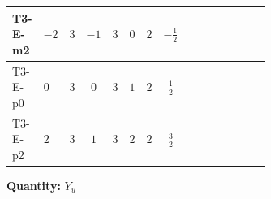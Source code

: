 \documentclass[8pt]{article}
\begin{document}
\begin{landscape}
\begin{longtable}{@{}llcccccc >{\raggedright\arraybackslash}p{0.21\linewidth} >{\raggedright\arraybackslash}p{0.21\linewidth} >{\raggedright\arraybackslash}p{0.21\linewidth}@{}}
\midrule
T3-E-m2 & $-2$ & $3$ & $-1$ & $3$ & $0$ & $2$ & $-\frac{1}{2}$ & \scriptsize\adjustbox{max width=\linewidth}{$\begin{gathered} 3 \operatorname{Tr}\!\left({Y_d}\,\left({Y_d}\right)^{\dagger}\right) \left({Y_u}\right)_{ij}\end{gathered}$} & \scriptsize\adjustbox{max width=\linewidth}{$\begin{gathered} +\operatorname{Tr}\!\left({Y_e}\,\left({Y_e}\right)^{\dagger}\right) \left({Y_u}\right)_{ij}\end{gathered}$} & \scriptsize\adjustbox{max width=\linewidth}{$\begin{gathered} +3 \operatorname{Tr}\!\left({Y_u}\,\left({Y_u}\right)^{\dagger}\right) \left({Y_u}\right)_{ij}\end{gathered}$} \\
\midrule
T3-E-p0 & $0$ & $3$ & $0$ & $3$ & $1$ & $2$ & $\frac{1}{2}$ & \scriptsize\adjustbox{max width=\linewidth}{$\begin{gathered} 3 \operatorname{Tr}\!\left({Y_d}\,\left({Y_d}\right)^{\dagger}\right) \left({Y_u}\right)_{ij}\end{gathered}$} & \scriptsize\adjustbox{max width=\linewidth}{$\begin{gathered} +\operatorname{Tr}\!\left({Y_e}\,\left({Y_e}\right)^{\dagger}\right) \left({Y_u}\right)_{ij}\end{gathered}$} & \scriptsize\adjustbox{max width=\linewidth}{$\begin{gathered} +3 \operatorname{Tr}\!\left({Y_u}\,\left({Y_u}\right)^{\dagger}\right) \left({Y_u}\right)_{ij}\end{gathered}$} \\
\midrule
T3-E-p2 & $2$ & $3$ & $1$ & $3$ & $2$ & $2$ & $\frac{3}{2}$ & \scriptsize\adjustbox{max width=\linewidth}{$\begin{gathered} 3 \operatorname{Tr}\!\left({Y_d}\,\left({Y_d}\right)^{\dagger}\right) \left({Y_u}\right)_{ij}\end{gathered}$} & \scriptsize\adjustbox{max width=\linewidth}{$\begin{gathered} +\operatorname{Tr}\!\left({Y_e}\,\left({Y_e}\right)^{\dagger}\right) \left({Y_u}\right)_{ij}\end{gathered}$} & \scriptsize\adjustbox{max width=\linewidth}{$\begin{gathered} +3 \operatorname{Tr}\!\left({Y_u}\,\left({Y_u}\right)^{\dagger}\right) \left({Y_u}\right)_{ij}\end{gathered}$} \\
\midrule
\bottomrule
\end{longtable}
\clearpage
\noindent\textbf{Quantity: }$Y_u$\par\smallskip

\end{landscape}
\end{document}
